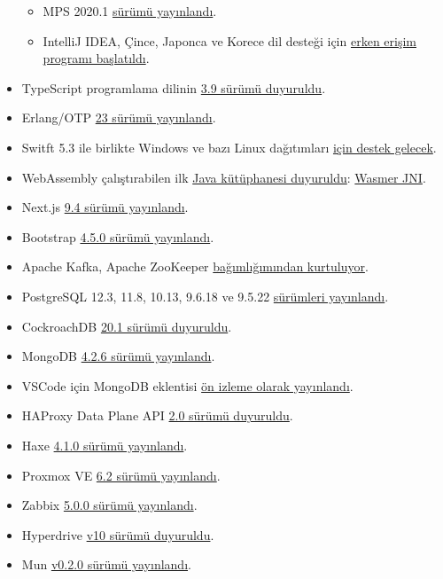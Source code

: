 \documentclass[11pt]{article}
\begin{document}
\begin{itemize}
\begin{itemize}
\item MPS 2020.1 \href{https://blog.jetbrains.com/mps/2020/05/mps-2020-1-has-been-released/}{sürümü yayınlandı}.
\item IntelliJ IDEA, Çince, Japonca ve Korece dil desteği için \href{https://blog.jetbrains.com/idea/2020/05/intellij-idea-localization-eap1/}{erken erişim
programı başlatıldı}.
\end{itemize}
\item TypeScript programlama dilinin \href{https://devblogs.microsoft.com/typescript/announcing-typescript-3-9/}{3.9 sürümü duyuruldu}.
\item Erlang/OTP \href{https://www.erlang.org/news/140}{23 sürümü yayınlandı}.
\item Switft 5.3 ile birlikte Windows ve bazı Linux dağıtımları \href{https://www.infoq.com/news/2020/05/swift-5-3-windows-linux/}{için destek
gelecek}.
\item WebAssembly çalıştırabilen ilk \href{https://medium.com/wasmer/announcing-the-first-java-library-to-run-webassembly-wasmer-jni-89e319d2ac7c}{Java kütüphanesi duyuruldu}: \href{https://github.com/wasmerio/java-ext-wasm}{Wasmer JNI}.
\item Next.js \href{https://nextjs.org/blog/next-9-4}{9.4 sürümü yayınlandı}.
\item Bootstrap \href{https://blog.getbootstrap.com/2020/05/12/bootstrap-4-5-0/}{4.5.0 sürümü yayınlandı}.
\item Apache Kafka, Apache ZooKeeper \href{https://www.confluent.io/blog/removing-zookeeper-dependency-in-kafka/}{bağımlığımından kurtuluyor}.
\item PostgreSQL 12.3, 11.8, 10.13, 9.6.18 ve 9.5.22 \href{https://www.postgresql.org/about/news/2038/}{sürümleri yayınlandı}.
\item CockroachDB \href{https://www.cockroachlabs.com/blog/cockroachdb-20-1-release/}{20.1 sürümü duyuruldu}.
\item MongoDB \href{https://www.mongodb.com/blog/post/introducing-mongodb-for-vs-code}{4.2.6 sürümü yayınlandı}.
\item VSCode için MongoDB eklentisi \href{https://www.mongodb.com/blog/post/introducing-mongodb-for-vs-code}{ön izleme olarak yayınlandı}.
\item HAProxy Data Plane API \href{https://www.haproxy.com/blog/announcing-haproxy-dataplane-api-20/}{2.0 sürümü duyuruldu}.
\item Haxe \href{https://haxe.org/blog/haxe-4.1.0-release/}{4.1.0 sürümü yayınlandı}.
\item Proxmox VE \href{https://www.proxmox.com/en/news/press-releases/proxmox-ve-6-2}{6.2 sürümü yayınlandı}.
\item Zabbix \href{https://www.zabbix.com/rn/rn5.0.0}{5.0.0 sürümü yayınlandı}.
\item Hyperdrive \href{https://blog.hypercore-protocol.org/posts/announcing-hyperdrive-10/}{v10 sürümü duyuruldu}.
\item Mun \href{https://mun-lang.org/blog/2020/05/16/release-mun-v0-2-0/}{v0.2.0 sürümü yayınlandı}.
\end{itemize}
\end{document}

